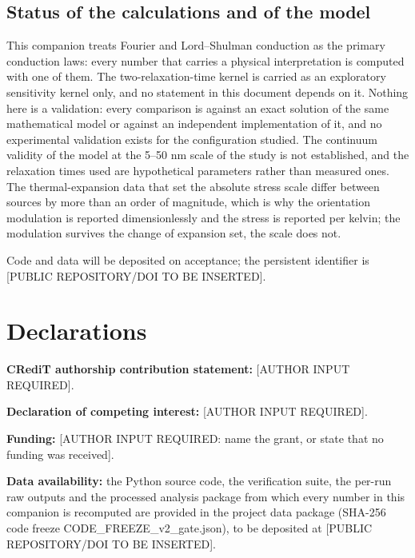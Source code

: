 \documentclass[preprint,12pt]{elsarticle}
\begin{document}
\subsection{Status of the calculations and of the model}
\label{sec:11.2}

This companion treats Fourier and Lord--Shulman conduction as the primary conduction laws: every number that carries a physical interpretation is computed with one of them. The two-relaxation-time kernel is carried as an exploratory sensitivity kernel only, and no statement in this document depends on it. Nothing here is a validation: every comparison is against an exact solution of the same mathematical model or against an independent implementation of it, and no experimental validation exists for the configuration studied. The continuum validity of the model at the 5--50 nm scale of the study is not established, and the relaxation times used are hypothetical parameters rather than measured ones. The thermal-expansion data that set the absolute stress scale differ between sources by more than an order of magnitude, which is why the orientation modulation is reported dimensionlessly and the stress is reported per kelvin; the modulation survives the change of expansion set, the scale does not.

Code and data will be deposited on acceptance; the persistent identifier is [PUBLIC REPOSITORY/DOI TO BE INSERTED].

\section*{Declarations}

\textbf{CRediT authorship contribution statement:} [AUTHOR INPUT REQUIRED].

\textbf{Declaration of competing interest:} [AUTHOR INPUT REQUIRED].

\textbf{Funding:} [AUTHOR INPUT REQUIRED: name the grant, or state that no funding was received].

\textbf{Data availability:} the Python source code, the verification suite, the per-run raw outputs and the processed analysis package from which every number in this companion is recomputed are provided in the project data package (SHA-256 code freeze CODE\_FREEZE\_v2\_gate.json), to be deposited at [PUBLIC REPOSITORY/DOI TO BE INSERTED].
\end{document}
